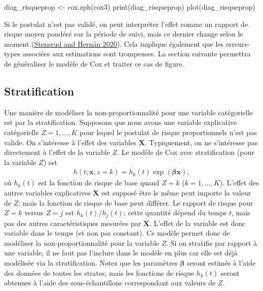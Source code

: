 \documentclass[
  11pt,
  letterpaper,
]{scrbook}
\newenvironment{Shaded}{\begin{snugshade}}{\end{snugshade}}
\newcommand{\FunctionTok}[1]{\textcolor[rgb]{0.28,0.35,0.67}{#1}}
\newcommand{\NormalTok}[1]{\textcolor[rgb]{0.00,0.23,0.31}{#1}}
\newcommand{\OtherTok}[1]{\textcolor[rgb]{0.00,0.23,0.31}{#1}}
\theoremstyle{definition}
\theoremstyle{remark}
\begin{document}
\begin{Shaded}
\begin{Highlighting}[]
\NormalTok{diag\_risqueprop }\OtherTok{\textless{}{-}} \FunctionTok{cox.zph}\NormalTok{(cox3)}
\FunctionTok{print}\NormalTok{(diag\_risqueprop)}
\FunctionTok{plot}\NormalTok{(diag\_risqueprop)}
\end{Highlighting}
\end{Shaded}

Si le postulat n'est pas validé, on peut interpréter l'effet comme un
rapport de risque moyen pondéré sur la période de suivi, mais ce dernier
change selon le moment
(\protect\hyperlink{ref-Stensrud.Hernan:2020}{Stensrud and Hernán
2020}). Cela implique également que les erreurs-types associées aux
estimations sont trompeuses. La section suivante permettra de
généraliser le modèle de Cox et traiter ce cas de figure.

\hypertarget{stratification}{%
\subsection{Stratification}\label{stratification}}

Une manière de modéliser la non-proportionnalité pour une variable
catégorielle est par la stratification. Supposons que nous avons une
variable explicative catégorielle \(Z=1, \ldots, K\) pour lequel le
postulat de risque proportionnels n'est pas valide. On s'intéresse à
l'effet des variables \(\mathbf{X}\). Typiquement, on ne s'intéresse pas
directement à l'effet de la variable \(Z\). Le modèle de Cox avec
stratification (pour la variable \(Z\)) est \begin{align*}
h(t; \mathbf{x}, z=k) = h_k(t) \exp(\boldsymbol{\beta} \mathbf{x}),
\end{align*} où \(h_k(t)\) est la fonction de risque de base quand
\(Z=k\) (\(k=1, \ldots, K\)). L'effet des autres variables explicatives
\(\mathbf{X}\) est supposé être le même peut importe la valeur de \(Z\),
mais la fonction de risque de base peut différer. Le rapport de risque
pour \(Z=k\) versus \(Z=j\) est \(h_k(t)/h_j(t)\); cette quantité dépend
du temps \(t\), mais pas des autres caractéristiques mesurées par
\(\mathbf{X}\). L'effet de la variable est donc variable dans le temps
(et non pas constant). Ce modèle permet donc de modéliser la
non-proportionnalité pour la variable \(Z\). Si on stratifie par rapport
à une variable, il ne faut pas l'inclure dans le modèle en plus car elle
est déjà modélisée via la stratification. Notez que les paramètres
\(\boldsymbol{\beta}\) seront estimés à l'aide des données de toutes les
strates, mais les fonctions de risque \(h_k(t)\) seront obtenues à
l'aide des sous-échantillons correspondant aux valeurs de \(Z\).
\end{document}
